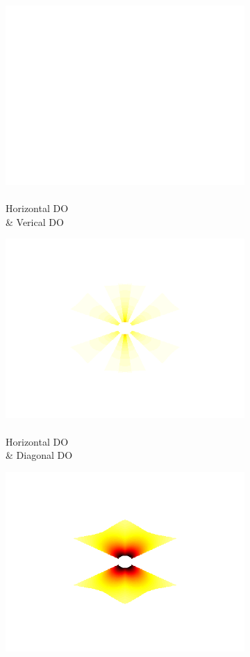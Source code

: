 \documentclass[journal,onecolumn]{IEEEtran}
\begin{document}
\begin{figure}[h]
\begin{subfigure}[b]{0.2\textwidth}
            \includegraphics[width=.85\linewidth]{w_blank}
            \caption{\\ Horizontal DO \\ \& Verical DO}
    \end{subfigure}%
    \begin{subfigure}[b]{0.2\textwidth}
            \centering
            \captionsetup{justification=centering}
            \includegraphics[width=.85\linewidth]{w_3_2}
            \caption{\\ Horizontal DO \\ \& Diagonal DO}
    \end{subfigure}%
    \begin{subfigure}[b]{0.2\textwidth}
            \centering
            \captionsetup{justification=centering}
            \includegraphics[width=.85\linewidth]{w_3_3}

\end{subfigure}
\end{figure}
\end{document}
